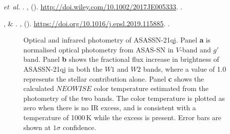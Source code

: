 \documentclass[sn-nature]{sn-jnl}%
\begin{document}
\begin{thebibliography}{10}
 \emph{et~al.}
\newblock {}.
\newblock \emph{}
  \textbf{}, 
  ().
\newblock \urlprefix\url{http://doi.wiley.com/10.1002/2017JE005333}.
\newblock {}.

,  \&
\newblock {}.
\newblock \emph{}
  \textbf{}, 
  ().
\newblock \urlprefix\url{https://doi.org/10.1016/j.epsl.2019.115885}.
\newblock {}.


\end{thebibliography}

\clearpage










\begin{figure}
\begin{centering}
\caption{Optical and infrared photometry of ASASSN-21qj.
%
Panel {\bf a} is normalised optical photometry from ASAS-SN in $V$-band and $g'$ band.
%
Panel {\bf b} shows the fractional flux increase in brightness of ASASSN-21qj in both the $W1$ and $W2$ bands, where a value of 1.0 represents the stellar contribution alone.
%
Panel {\bf c} shows the calculated $NEOWISE$ color temperature estimated from the photometry of the two bands.
%
The color temperature is plotted as zero when there is no IR excess, and is consistent with a temperature of 1000\,K while the excess is present.
%
Error bars are shown at $1\sigma$ confidence.
}
\label{fig:wisephot}
\end{centering}
\end{figure}
\end{document}
